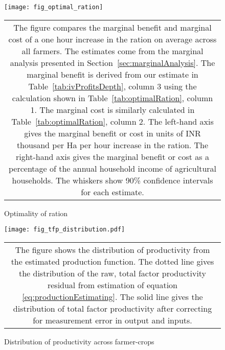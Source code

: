 \documentclass{article}
\numberwithin{table}{section}
\begin{document}
\begin{figure}[htbp]
	\centering \caption{Optimality of ration\label{fig:optimalityOfRation}}
	\texttt{[image: fig\_optimal\_ration]}
	\begin{tabular*}{1.0\textwidth}{c}
		\multicolumn{1}{p{1.0\hsize}}{\footnotesize The figure compares the marginal benefit and marginal cost of a one hour increase in the ration on average across all farmers. The estimates come from the marginal analysis presented in Section~\ref{sec:marginalAnalysis}. The marginal benefit is derived from our estimate in Table~\ref{tab:ivProfitsDepth}, column 3 using the calculation shown in Table~\ref{tab:optimalRation}, column 1. The marginal cost is similarly calculated in Table~\ref{tab:optimalRation}, column 2. The left-hand axis gives the marginal benefit or cost in units of INR thousand per Ha per hour increase in the ration. The right-hand axis gives the marginal benefit or cost as a percentage of the annual household income of agricultural households. The whiskers show 90\% confidence intervals for each estimate.}
	\end{tabular*}
\end{figure}

\begin{figure}[htbp]
\centering\caption{Distribution of productivity across farmer-crops\label{fig:tfpDistribution}}
\texttt{[image: fig\_tfp\_distribution.pdf]}
\begin{tabular*}{1.0\hsize}{c}
	\multicolumn{1}{p{1.0\hsize}}{\footnotesize The figure shows the distribution of productivity from the estimated production function. The dotted line gives the distribution of the raw, total factor productivity residual from estimation of equation \ref{eq:productionEstimating}. The solid line gives the distribution of total factor productivity after correcting for measurement error in output and inputs.}\\
\end{tabular*}
\end{figure}
\end{document}

